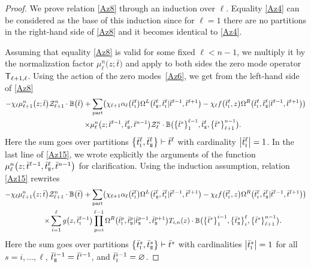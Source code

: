 \documentclass[pdftex]{sigma}
\newcommand{\so}{\scriptscriptstyle \rm I}
\newcommand{\st}{\scriptscriptstyle \rm I\hspace{-1pt}I}
\newcommand{\bt}{{\bar t}}
\theoremstyle{definition}
\def\BB{{\mathbb{B}}}
\def\r#1{\eqref{#1}}
\def\sT{{\sf T}}
\def\vk{\chi}
\def\Z{\mathcal{Z}}
\def\Oml{\Omega^L}
\def\Omr{\Omega^R}
\begin{document}
\begin{proof}
 We prove relation \r{Az8} through an induction over $\ell$.
Equality
\r{Az4} can be considered as the base of this induction since for $\ell=1$
there are no partitions in the right-hand side of \r{Az8} and it becomes identical to
\r{Az4}.

Assuming that equality \r{Az8} is valid for
some fixed $\ell< n-1$, we multiply it by the
normalization factor $\mu^n_\ell\bigl(z;\bt\bigr)$ and apply to both sides the
zero mode operator $\sT_{\ell+1,\ell}$.
Using the action of the zero modes~\r{Az6}, we get from the left-hand side of \r{Az8}
\begin{gather}
-\vk_{\ell} \mu^n_{\ell+1}\bigl(z;\bt\bigr) \Z_{\ell+1}^n\cdot \BB\bigl(\bt\bigr) +\sum_{\rm part}\bigl(\vk_{\ell+1} \alpha_{\ell}\bigl(\bt^\ell_{\so}\bigr)
\Oml\bigl(\bt^\ell_{\st},\bt^\ell_{\so}|\bt^{\ell-1},\bt^{\ell+1}\bigr)-
\vk_\ell f\bigl(\bt^\ell_{\so},z\bigr)
\Omr\bigl(\bt^\ell_{\so},\bt^\ell_{\st}|\bt^{\ell-1},\bt^{\ell+1}\bigr)\bigr)\nonumber\\
\qquad \times \mu^n_\ell\bigl(z;\bt^{\ell-1},\bt^\ell_{\st},\bt^{n-1}\bigr)
\Z_{\ell}^n\cdot \BB\bigl(\bigl\{\bt^s\bigr\}_1^{\ell-1},\bt^\ell_{\st},\bigl\{\bt^s\bigr\}_{\ell+1}^{n-1}\bigr) .\label{Az15}
\end{gather}
Here the sum goes over partitions $\bigl\{\bt^\ell_{\so},\bt^\ell_{\st}\bigr\}\vdash
\bt^\ell$ with cardinality $\big|\bt^\ell_{\so}\big|=1$. In the last line of \eqref{Az15}, we wrote explicitly the arguments
of the function $\mu^n_\ell\bigl(z;\bt^{\ell-1},\bt^\ell_{\st},\bt^{n-1}\bigr)$ for clarification.
Using the induction assumption, relation \r{Az15} rewrites
\begin{gather}
-\vk_{\ell} \mu^n_{\ell+1}\bigl(z;\bt\bigr) \Z_{\ell+1}^n\cdot \BB\bigl(\bt\bigr) +\sum_{\rm part}
\bigl(\vk_{\ell+1} \alpha_{\ell}\bigl(\bt^\ell_{\so}\bigr)
\Oml\bigl(\bt^\ell_{\st},\bt^\ell_{\so}|\bt^{\ell-1},\bt^{\ell+1}\bigr)-
\vk_\ell f\bigl(\bt^\ell_{\so},z\bigr)
\Omr\bigl(\bt^\ell_{\so},\bt^\ell_{\st}|\bt^{\ell-1},\bt^{\ell+1}\bigr)\bigr)\nonumber\\
\qquad \times
\sum_{i=1}^\ell g\bigl(z,\bt^{\ell-1}_{\so}\bigr)
\prod_{p=i}^{\ell-1}\Omr\bigl(\bt^p_{\so},\bt^p_{\st}|\bt^{p-1}_{\st},\bt^{p+1}_{\st}\bigr)
 T_{i,n}(z)\cdot\BB\bigl(\bigl\{\bt^s\bigr\}_1^{i-1},\bigl\{\bt^s_{\st}\bigr\}_i^{\ell},
\bigl\{\bt^s\bigr\}_{\ell+1}^{n-1}\bigr) .\label{Az15a}
\end{gather}
Here the sum goes over partitions $\bigl\{\bt^s_{\so},\bt^s_{\st}\bigr\}\vdash\bt^s$
with cardinalities $\big|\bt^s_{\so}\big|=1$ for all $s=i,\dots,\ell$, $\bt^{i-1}_{\st} = \bt^{i-1}$, and $\bt^{i-1}_{\so} = \varnothing$.


\end{proof}
\end{document}
